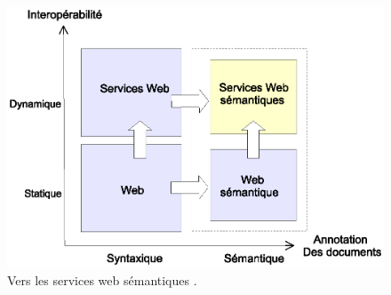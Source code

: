 \begin{figure}[h]
    \centering
    \includegraphics[width=1\textwidth]{figs/www-to-sws.eps}
    \caption{Vers les services web sémantiques \cite{fensel2002semantic}.}
    \label{fig:www-to-sws}
\end{figure}


